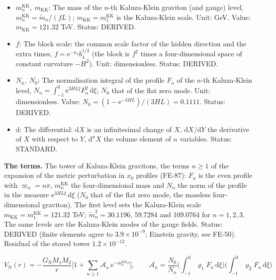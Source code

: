\documentclass[
  10pt,
]{article}
\begin{document}
\begin{itemize}
  first). Unit: dimensionless. Value: \(\tilde m_1^2 = 30.1196\),
  \(\tilde m_2^2 = 59.7284\), \(\tilde m_3^2 = 109.0764\) (\(HL = 3\)),
  i.e.~\(\tilde m_1 = 5.48813\), \(\tilde m_2 = 7.72842\),
  \(\tilde m_3 = 10.44397\). Status: DERIVED.
\item
  \(m^{\mathrm{KK}}_n,\ m_{\mathrm{KK}}\): The mass of the \(n\)-th
  Kaluza-Klein graviton (and gauge) level,
  \(m^{\mathrm{KK}}_n = \tilde m_n/(fL)\);
  \(m_{\mathrm{KK}} = m^{\mathrm{KK}}_1\) is the Kaluza-Klein scale.
  Unit: GeV. Value: \(m_{\mathrm{KK}} = 121.32\) TeV. Status: DERIVED.
\item
  \(f\): The block scale: the common scale factor of the hidden
  direction and the extra times, \(f = \mathrm{e}^{-a_4}b_4^{1/2}\) (the
  block is \(f^2\) times a four-dimensional space of constant curvature
  \(-H^2\)). Unit: dimensionless. Status: DERIVED.
\item
  \(N_n,\ N_0\): The normalisation integral of the profile \(F_n\) of
  the \(n\)-th Kaluza-Klein level,
  \(N_n = \int_{-1}^{0}\mathrm{e}^{3HL\xi}F_n^2\,\mathrm{d}\xi\);
  \(N_0\) that of the flat zero mode. Unit: dimensionless. Value:
  \(N_0 = (1 - \mathrm{e}^{-3HL})/(3HL) = 0.1111\). Status: DERIVED.
\item
  \(\mathrm{d}\): The differential: \(\mathrm{d}X\) is an infinitesimal
  change of \(X\), \(\mathrm{d}X/\mathrm{d}Y\) the derivative of \(X\)
  with respect to \(Y\), \(\mathrm{d}^nX\) the volume element of \(n\)
  variables. Status: STANDARD.
\end{itemize}

\textbf{The terms.} The tower of Kaluza-Klein gravitons, the terms
\(n \ge 1\) of the expansion of the metric perturbation in \(x_0\)
profiles (FE-87): \(F_n\) is the even profile with \(\varpi_n = n\pi\),
\(m^{\mathrm{KK}}_n\) the four-dimensional mass and \(N_n\) the norm of
the profile in the measure \(\mathrm{e}^{3HL\xi}\,\mathrm{d}\xi\)
(\(N_0\) that of the flat zero mode, the massless four-dimensional
graviton). The first level sets the Kaluza-Klein scale
\(m_{\mathrm{KK}} = m^{\mathrm{KK}}_1 = 121.32\) TeV;
\(\tilde m_n^2 = 30.1196\), 59.7284 and 109.0764 for \(n = 1, 2, 3\).
The same levels are the Kaluza-Klein modes of the gauge fields. Status:
DERIVED (finite elements agree to \(3.9\times10^{-9}\); Einstein
gravity, see FE-50). Residual of the stored tower \(1.2\times10^{-12}\).

\[
V_{\mathrm{N}}(r) = -\frac{G_{\mathrm{N}}M_1M_2}{r}\Big[1 +
 \sum_{n\ge1}\mathcal{A}_n\,\mathrm{e}^{-m^{\mathrm{KK}}_nr}\Big],\qquad
\mathcal{A}_n = \frac{N_0}{N_n}\Big(\int_{-1}^{0}\varrho_1F_n\,\mathrm{d}\xi\Big)\Big(\int_{-1}^{0}
 \varrho_2F_n\,\mathrm{d}\xi\Big) \tag{FE-54}
\]
\end{document}

